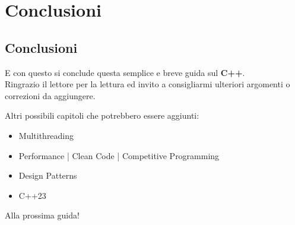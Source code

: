 


\chapter*{Conclusioni}

\section{Conclusioni}

\textsf{\small E con questo si conclude questa semplice e breve guida sul \textbf{C++}.} \\

\textsf{\small Ringrazio il lettore per la lettura ed invito a consigliarmi ulteriori argomenti o correzioni da aggiungere.} \break

\textsf{\small Altri possibili capitoli che potrebbero essere aggiunti: } \\

\begin{itemize}
	\item \textsf{\small Multithreading}
	\item \textsf{\small Performance | Clean Code | Competitive Programming}
	\item \textsf{\small Design Patterns}
	\item \textsf{\small C++23}
\end{itemize}

\textsf{\small Alla prossima guida!} \break

\begin{flushleft}
	\cursive{}
	
\end{flushleft}

